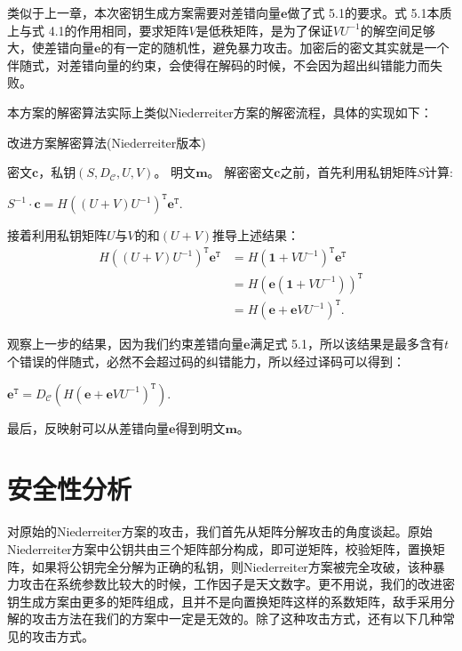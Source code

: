 类似于上一章，本次密钥生成方案需要对差错向量$\mathbf{e}$做了式 5.1的要求。式 5.1本质上与式 4.1的作用相同，要求矩阵$V$是低秩矩阵，是为了保证$VU^{-1}$的解空间足够大，使差错向量$\mathbf{e}$的有一定的随机性，避免暴力攻击。加密后的密文其实就是一个伴随式，对差错向量的约束，会使得在解码的时候，不会因为超出纠错能力而失败。

本方案的解密算法实际上类似Niederreiter方案的解密流程，具体的实现如下：

\begin{breakablealgorithm}
	\small
	\renewcommand{\algorithmicrequire}{\textbf{Input:}}
	\renewcommand{\algorithmicensure}{\textbf{Output:}}
	\caption{改进方案解密算法(Niederreiter版本)}
	\label{alg:NewDeN}
	\begin{algorithmic}[1]
		\Require
		密文$\mathbf{c}$，私钥$(S,D_\mathcal{C},U,V)$。
		\Ensure
		明文$\mathbf{m}$。
		\State
		解密密文$\mathbf{c}$之前，首先利用私钥矩阵$S$计算:
		\begin{center}
			$S^{-1} \cdot \textbf{c} = H((U + V)U^{-1})^\mathtt{T}\mathbf{e}^\mathtt{T}.$
		\end{center}
		\State
		接着利用私钥矩阵$U$与$V$的和$(U + V)$推导上述结果：
		\begin{equation}
		\begin{aligned}
		H((U + V)U^{-1})^\mathtt{T}\mathbf{e}^\mathtt{T} &= H(\mathbf{1} +VU^{-1})^\mathtt{T}\mathbf{e}^\mathtt{T} \\
		& = H(\mathbf{e}(\mathbf{1} +VU^{-1}))^\mathtt{T} \\
		& = H(\mathbf{e} + \mathbf{e}VU^{-1})^\mathtt{T}.
		\end{aligned}
		\end{equation}
		
		\State
		观察上一步的结果，因为我们约束差错向量$\mathbf{e}$满足式 5.1，所以该结果是最多含有$t$个错误的伴随式，必然不会超过码的纠错能力，所以经过译码可以得到：
		\begin{center}
			$\mathbf{e} ^ \mathtt{T} = D_\mathcal{C}(H(\mathbf{e} + \mathbf{e}VU^{-1})^\mathtt{T}).$
		\end{center}
		
		\State
		最后，反映射可以从差错向量$\mathbf{e}$得到明文$\mathbf{m}$。		
	\end{algorithmic}
\end{breakablealgorithm}

\section{安全性分析}
对原始的Niederreiter方案的攻击，我们首先从矩阵分解攻击的角度谈起。原始Niederreiter方案中公钥共由三个矩阵部分构成，即可逆矩阵，校验矩阵，置换矩阵，如果将公钥完全分解为正确的私钥，则Niederreiter方案被完全攻破，该种暴力攻击在系统参数比较大的时候，工作因子是天文数字。更不用说，我们的改进密钥生成方案由更多的矩阵组成，且并不是向置换矩阵这样的系数矩阵，敌手采用分解的攻击方法在我们的方案中一定是无效的。除了这种攻击方式，还有以下几种常见的攻击方式。

